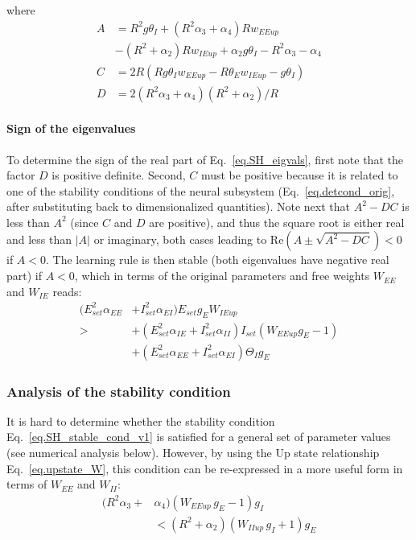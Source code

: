 \documentclass[
twocolumn,
]{article}
\newcommand{\EE}{\mathit{EE}}
\newcommand{\EI}{\mathit{EI}}
\newcommand{\IE}{\mathit{IE}}
\newcommand{\II}{\mathit{II}}
\newcommand{\set}{\mathit{set}}
\newcommand{\up}{\mathit{up}}
\newcommand{\RE}{\mathrm{Re}}
\begin{document}
\noindent where
\begin{equation}
\begin{aligned}
A & = R^2 g \theta_I + (R^2 \alpha_3 + \alpha_4) R w_{\EE\up} \\
& - (R^2 + \alpha_2)R w_{\IE\up} + \alpha_2 g \theta_I - R^2 \alpha_3 - \alpha_4 \\
C & = 2R(R g \theta_I w_{\EE\up} - R \theta_E w_{\IE\up} - g \theta_I) \\
D & = 2(R^2\alpha_3 + \alpha_4)(R^2 + \alpha_2)/R
\end{aligned}
\end{equation}


\paragraph{Sign of the eigenvalues}

To determine the sign of the real part of Eq.\ \ref{eq.SH_eigvals}, first note that the factor $D$ is positive definite. Second, $C$ must be positive because it is related to one of the stability conditions of the neural subsystem (Eq.\ \ref{eq.detcond_orig}, after substituting back to dimensionalized quantities). Note next that $A^2 - DC$ is less than $A^2$ (since $C$ and $D$ are positive), and thus the square root is either real and less than $|A|$ or imaginary, both cases leading to $\RE(A \pm \sqrt{A^2-DC}) < 0$ if $A<0$. The learning rule is then stable (both eigenvalues have negative real part) if $A<0$, which in terms of the original parameters and free weights $W_{\EE}$ and $W_{\IE}$ reads:
\begin{equation}
\begin{aligned}
(E_{\set}^2 \alpha_{\EE} & + I_{\set}^2 \alpha_{\EI}) E_{\set} g_E W_{\IE\up} \\
> & + (E_{\set}^2 \alpha_{\IE} + I_{\set}^2 \alpha_{\II}) I_{\set}(W_{\EE\up} g_E - 1) \\
& + (E_{\set}^2 \alpha_{\EE} + I_{\set}^2 \alpha_{\EI}) \Theta_I g_E
\end{aligned}
\label{eq.SH_stable_cond_v1}
\end{equation}


\subsubsection{Analysis of the stability condition}

It is hard to determine whether the stability condition Eq.\ \ref{eq.SH_stable_cond_v1} is satisfied for a general set of parameter values (see numerical analysis below). However, by using the Up state relationship Eq.\ \ref{eq.upstate_W}, this condition can be re-expressed in a more useful form in terms of $W_{\EE}$ and $W_{\II}$:
\begin{equation}
\begin{aligned}
(R^2 \alpha_3 + & \alpha_4)(W_{\EE\up} \, g_E  - 1)g_I \\
& < (R^2 + \alpha_2)(W_{\II\up} \, g_I + 1)g_E
\end{aligned}
\label{eq.SH_stable_cond_v2}
\end{equation}
\end{document}
